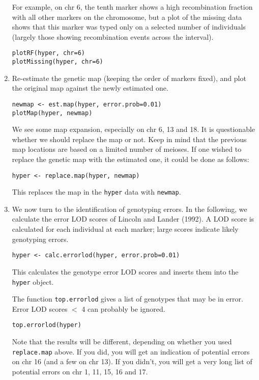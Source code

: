 \documentclass[10pt,letterpaper]{article}
\newcommand{\usercolor}{\color [named]{BlueViolet}}
\begin{document}
\begin{enumerate}
For example, on chr 6, the tenth marker shows a high recombination
fraction with all other markers on the chromosome, but a plot of the
missing data shows that this marker was typed only on a selected
number of individuals (largely those showing recombination events
across the interval).

\usercolor \verb|plotRF(hyper, chr=6)| \\
\verb|plotMissing(hyper, chr=6)| \normalcolor

\item Re-estimate the genetic map (keeping the order of markers
fixed), and plot the original map against the newly estimated one. 

\usercolor \verb|newmap <- est.map(hyper, error.prob=0.01)| \\
\verb|plotMap(hyper, newmap)| \normalcolor

We see some map expansion, especially on chr 6, 13 and 18.  It
is questionable whether we should replace the map or not.  Keep in
mind that the previous map locations are based on a limited number of
meioses.  If one wished to replace the genetic map with the estimated
one, it could be done as follows:

\usercolor
\verb|hyper <- replace.map(hyper, newmap)| \normalcolor

This replaces the map in the \verb-hyper- data with \verb-newmap-.


\item We now turn to the identification of genotyping errors.  In the
following, we calculate the error LOD scores of Lincoln and Lander
(1992).  A LOD score is calculated for each individual at each marker;
large scores indicate likely genotyping errors.

\usercolor 
\verb|hyper <- calc.errorlod(hyper, error.prob=0.01)| 
\normalcolor

This calculates the genotype error LOD scores and inserts them into
the \verb-hyper- object.

The function \verb-top.errorlod- gives a list of genotypes that may be
in error.  Error LOD scores $<$ 4 can probably be ignored.

\usercolor 
\verb|top.errorlod(hyper)| 
\normalcolor

Note that the results will be different, depending on whether you used
\verb-replace.map- above.  If you did, you will get an indication of
potential errors on chr 16 (and a few on chr 13).  If you didn't, you will get a very long
list of potential errors on chr 1, 11, 15, 16 and 17.


\end{enumerate}
\end{document}
